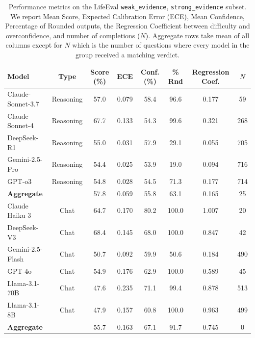 \begin{table}[t]
    \centering
    \small
    \begin{tabular}{lccccccc}
    \toprule
    \textbf{Model} & \textbf{Type} & \textbf{ Score (\%)} & \textbf{ECE} & \textbf{Conf. (\%)} & \textbf{\% Rnd} & \textbf{Regression Coef.} & \textbf{$N$} \\
    \midrule
    Claude-Sonnet-3.7    & Reasoning & 57.0 & 0.079 & 58.4 & 96.6  & 0.177 & 59 \\
    Claude-Sonnet-4      & Reasoning & 67.7 & 0.133 & 54.3 & 99.6  & 0.321 & 268 \\
    DeepSeek-R1          & Reasoning & 55.0 & 0.031 & 57.9 & 29.1  & 0.055 & 705 \\
    Gemini-2.5-Pro       & Reasoning & 54.4 & 0.025 & 53.9 & 19.0  & 0.094 & 716 \\
    GPT-o3               & Reasoning & 54.8 & 0.028 & 54.5 & 71.3  & 0.177 & 714 \\
    \midrule  %
    {\textbf{Aggregate}}  &           & 57.8 & 0.059 & 55.8 & 63.1  & 0.165 & 25 \\
    \toprule    %
    Claude Haiku 3       & Chat & 64.7 & 0.170 & 80.2 & 100.0  & 1.007 & 20 \\
    DeepSeek-V3          & Chat & 68.4 & 0.145 & 68.0 & 100.0  & 0.847 & 42 \\
    Gemini-2.5-Flash     & Chat & 50.7 & 0.092 & 59.9 & 50.6  & 0.184 & 490 \\
    GPT-4o               & Chat & 54.9 & 0.176 & 62.9 & 100.0  & 0.589 & 45 \\
    Llama-3.1-70B        & Chat & 47.6 & 0.235 & 71.1 & 99.4  & 0.878 & 513 \\
    Llama-3.1-8B         & Chat & 47.9 & 0.157 & 60.8 & 100.0  & 0.963 & 499 \\
    \midrule  %
    {\textbf{Aggregate}}  &           & 55.7 & 0.163 & 67.1 & 91.7  & 0.745 & 0 \\

    \bottomrule
    \end{tabular}
    \caption{Performance metrics on the LifeEval \texttt{weak\_evidence}, \texttt{strong\_evidence} subset. We report Mean Score, Expected Calibration Error (ECE), Mean Confidence, Percentage of Rounded outputs, the Regression Coefficient between difficulty and overconfidence, and number of completions ($N$). Aggregate rows take mean of all columns except for $N$ which is the number of questions where every model in the group received a matching verdict.}
    \label{}
\end{table}
